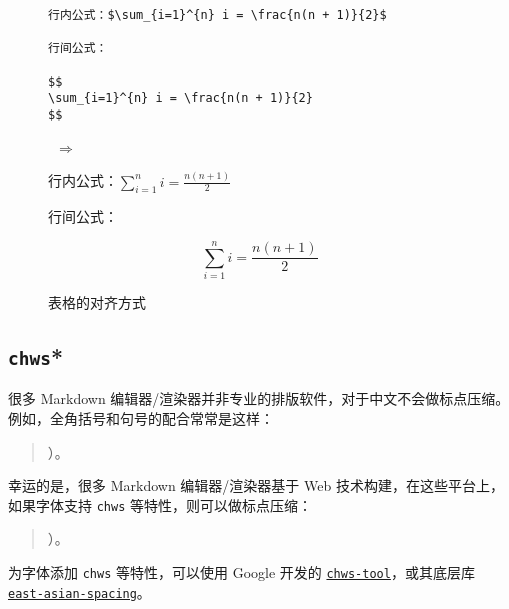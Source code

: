 \documentclass[a4paper,fontset=none]{ctexart}
\begin{document}
\begin{figure}[H]
    \centering
    \begin{minipage}{0.45\textwidth}
        \begin{verbatim}
行内公式：$\sum_{i=1}^{n} i = \frac{n(n + 1)}{2}$

行间公式：

$$
\sum_{i=1}^{n} i = \frac{n(n + 1)}{2}
$$
        \end{verbatim}
    \end{minipage}
    \, $\Longrightarrow$ \,
    \begin{minipage}{0.45\textwidth}
\begin{markdown}
行内公式：$\sum_{i=1}^{n} i = \frac{n(n + 1)}{2}$

行间公式：

$$
\sum_{i=1}^{n} i = \frac{n(n + 1)}{2}
$$
\end{markdown}
    \end{minipage}
    \caption{表格的对齐方式}
\end{figure}

\subsection{\texttt{chws}*}

很多 Markdown 编辑器/渲染器并非专业的排版软件，对于中文不会做标点压缩。例如，全角括号和句号的配合常常是这样：

\begin{quotation}
    ）\null 。
\end{quotation}

幸运的是，很多 Markdown 编辑器/渲染器基于 Web 技术构建，在这些平台上，如果字体支持 \verb|chws| 等特性，则可以做标点压缩：

\begin{quotation}
    ）。
\end{quotation}

为字体添加 \verb|chws| 等特性，可以使用 Google 开发的 \href{https://github.com/googlefonts/chws_tool}{\texttt{chws-tool}}，或其底层库 \href{https://github.com/kojiishi/east_asian_spacing}{\texttt{east-asian-spacing}}。
\end{document}
